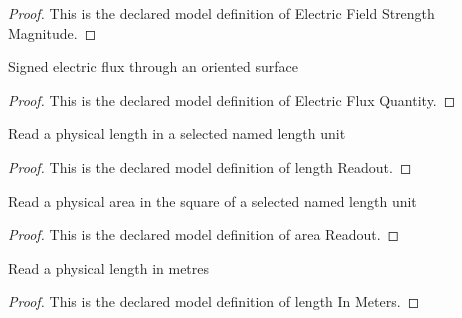 \begin{proof}
  This is the declared model definition of Electric Field Strength Magnitude.
\end{proof}
\begin{definition}
  \label{def:physics:phyx-mini-0998:phyxminiproblems-problemphyxmini0998-electricfluxquantity}
  Signed electric flux through an oriented surface
\end{definition}
\begin{proof}
  This is the declared model definition of Electric Flux Quantity.
\end{proof}
\begin{definition}
  \label{def:physics:phyx-mini-0998:phyxminiproblems-problemphyxmini0998-lengthreadout}
  Read a physical length in a selected named length unit
\end{definition}
\begin{proof}
  This is the declared model definition of length Readout.
\end{proof}
\begin{definition}
  \label{def:physics:phyx-mini-0998:phyxminiproblems-problemphyxmini0998-areareadout}
  Read a physical area in the square of a selected named length unit
\end{definition}
\begin{proof}
  This is the declared model definition of area Readout.
\end{proof}
\begin{definition}
  \label{def:physics:phyx-mini-0998:phyxminiproblems-problemphyxmini0998-lengthinmeters}
  Read a physical length in metres
\end{definition}
\begin{proof}
  This is the declared model definition of length In Meters.
\end{proof}
